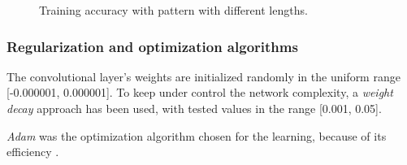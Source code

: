 \begin{center}
	\begin{figure}[ht!]
		\caption{Training accuracy with pattern with different lengths.}
	\end{figure}
\end{center}

\subsubsection{Regularization and optimization algorithms}
The convolutional layer's weights are initialized randomly in the uniform range [-0.000001, 0.000001]. To keep under control the network complexity, a \textit{weight decay} approach has been used, with tested values in the range [0.001, 0.05].

\textit{Adam} was the optimization algorithm chosen for the learning, because of its efficiency \cite{Kin14}.

